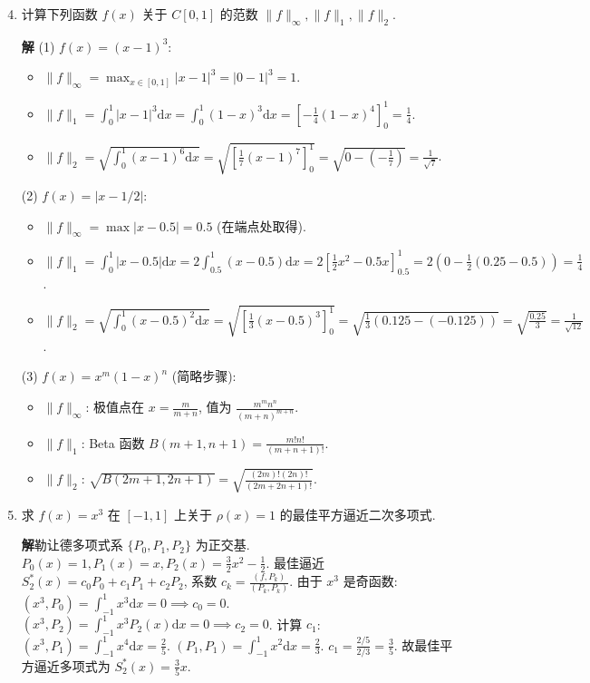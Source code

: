 \documentclass[a4paper,11pt]{ctexart}
\newcommand{\sol}{\par\noindent\textbf{解}\quad}
\newcommand{\ud}{\mathrm{d}}
\begin{document}
\begin{enumerate}[label=\textbf{3-\arabic*.}, leftmargin=*]
    \setcounter{enumi}{3}
    \item 计算下列函数 $f(x)$ 关于 $C[0,1]$ 的范数 $\|f\|_\infty, \|f\|_1, \|f\|_2$.
    
    \sol 
    (1) $f(x) = (x-1)^3$:
    \begin{itemize}
        \item $\|f\|_\infty = \max_{x\in[0,1]} |x-1|^3 = |0-1|^3 = 1$.
        \item $\|f\|_1 = \int_0^1 |x-1|^3 \ud x = \int_0^1 (1-x)^3 \ud x = [-\frac{1}{4}(1-x)^4]_0^1 = \frac{1}{4}$.
        \item $\|f\|_2 = \sqrt{\int_0^1 (x-1)^6 \ud x} = \sqrt{[\frac{1}{7}(x-1)^7]_0^1} = \sqrt{0 - (-\frac{1}{7})} = \frac{1}{\sqrt{7}}$.
    \end{itemize}

    (2) $f(x) = |x - 1/2|$:
    \begin{itemize}
        \item $\|f\|_\infty = \max |x-0.5| = 0.5$ (在端点处取得).
        \item $\|f\|_1 = \int_0^1 |x-0.5| \ud x = 2 \int_{0.5}^1 (x-0.5) \ud x = 2 [\frac{1}{2}x^2-0.5x]_{0.5}^1 = 2(0-\frac{1}{2}(0.25-0.5)) = \frac{1}{4}$.
        \item $\|f\|_2 = \sqrt{\int_0^1 (x-0.5)^2 \ud x} = \sqrt{[\frac{1}{3}(x-0.5)^3]_0^1} = \sqrt{\frac{1}{3}(0.125 - (-0.125))} = \sqrt{\frac{0.25}{3}} = \frac{1}{\sqrt{12}}$.
    \end{itemize}

    (3) $f(x) = x^m(1-x)^n$ (简略步骤):
    \begin{itemize}
        \item $\|f\|_\infty$: 极值点在 $x = \frac{m}{m+n}$, 值为 $\frac{m^m n^n}{(m+n)^{m+n}}$.
        \item $\|f\|_1$: Beta 函数 $B(m+1, n+1) = \frac{m!n!}{(m+n+1)!}$.
        \item $\|f\|_2$: $\sqrt{B(2m+1, 2n+1)} = \sqrt{\frac{(2m)!(2n)!}{(2m+2n+1)!}}$.
    \end{itemize}

    \item[13.] 求 $f(x) = x^3$ 在 $[-1, 1]$ 上关于 $\rho(x) = 1$ 的最佳平方逼近二次多项式.
    
    \sol 勒让德多项式系 $\{P_0, P_1, P_2\}$ 为正交基.
    $P_0(x)=1, P_1(x)=x, P_2(x)=\frac{3}{2}x^2-\frac{1}{2}$.
    最佳逼近 $S_2^*(x) = c_0 P_0 + c_1 P_1 + c_2 P_2$, 系数 $c_k = \frac{(f, P_k)}{(P_k, P_k)}$.
    由于 $x^3$ 是奇函数:
    $(x^3, P_0) = \int_{-1}^1 x^3 \ud x = 0 \implies c_0=0$.
    $(x^3, P_2) = \int_{-1}^1 x^3 P_2(x) \ud x = 0 \implies c_2=0$.
    计算 $c_1$:
    $(x^3, P_1) = \int_{-1}^1 x^4 \ud x = \frac{2}{5}$.
    $(P_1, P_1) = \int_{-1}^1 x^2 \ud x = \frac{2}{3}$.
    $c_1 = \frac{2/5}{2/3} = \frac{3}{5}$.
    故最佳平方逼近多项式为 $S_2^*(x) = \frac{3}{5}x$.


\end{enumerate}
\end{document}
